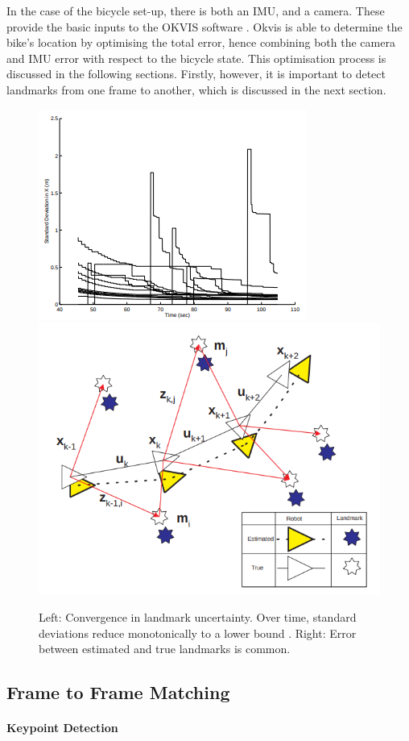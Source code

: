 \documentclass[11pt,twoside]{report}
\begin{document}
In the case of the bicycle set-up, there is both an IMU, and a camera. These provide the basic inputs to the OKVIS software \cite{Okvis_1}. Okvis is able to determine the bike's location by optimising the total error, hence combining both the camera and IMU error with respect to the bicycle state. This optimisation process is discussed in the following sections. Firstly, however, it is important to detect landmarks from one frame to another, which is discussed in the next section.

\noindent \begin{figure}[h!]
	\includegraphics[width = 0.5\hsize]{figures/convergence_landmark_uncertainty.png}
	\includegraphics[width = 0.5\hsize]{figures/ess_slam.png}
	\caption{Left: Convergence in landmark uncertainty.  Over time, standard deviations reduce monotonically to a lower bound \cite{F_Durr_Pt1}. Right: Error between estimated and true landmarks is common.}
	\label{slam_prob_fig}
\end{figure}




\subsection{Frame to Frame Matching}\label{BRISK_section}

\paragraph{Keypoint Detection}
\end{document}
